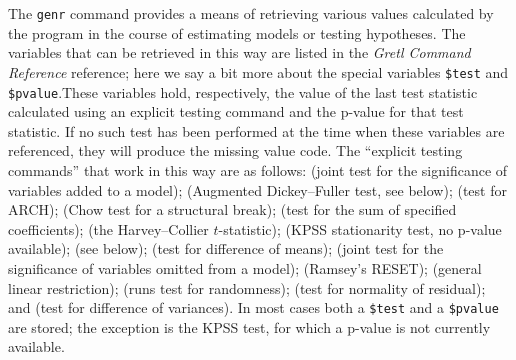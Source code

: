 The \verb+genr+ command provides a means of retrieving
      various values calculated by the program in the course of estimating
      models or testing hypotheses.  The variables that can be retrieved in this
      way are listed in the \emph{Gretl Command Reference}
      reference; here we say a bit more about the special variables
      \verb+$test+ and \verb+$pvalue+.These variables hold, respectively, the value of the last test statistic
      calculated using an explicit testing command and the p-value for that test
      statistic.  If no such test has been performed at the time when these
      variables are referenced, they will produce the missing value code.  The
      ``explicit testing commands'' that work in this way are as follows:
       (joint test for the significance of variables added
      to a model); 
       (Augmented Dickey--Fuller test, see below);
       (test for ARCH);
       (Chow test for a structural break);
       (test for the sum of specified coefficients);
       (the Harvey--Collier
      $t$-statistic);
       (KPSS stationarity test, no p-value available);
       (see below);
       (test for difference of means);
       (joint test for the significance of variables
      omitted from a model);
       (Ramsey's RESET);
       (general linear restriction);
       (runs test for randomness); 
       (test for normality of residual); and
       (test for difference of variances). In most
      cases both a \verb+$test+ and a \verb+$pvalue+ are
      stored; the exception is the KPSS test, for which a p-value is not currently
      available.  
    
